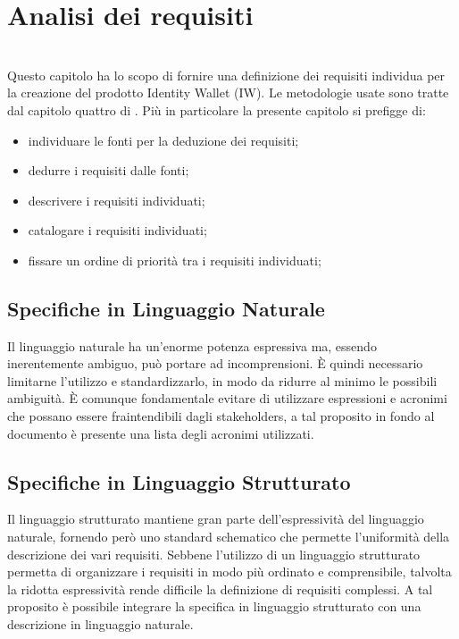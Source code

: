 
\chapter{Analisi dei requisiti}
\label{cap:analisi-requisiti}

\\
Questo capitolo ha lo scopo di fornire una definizione dei requisiti individua per la creazione del prodotto Identity Wallet (IW). Le metodologie usate sono tratte dal capitolo quattro di \cite{som:swe}.
Più in particolare la presente capitolo si prefigge di: 
\begin{itemize}
    \item individuare le fonti per la deduzione dei requisiti; 
    \item dedurre i requisiti dalle fonti; 
    \item descrivere i requisiti individuati; 
    \item catalogare i requisiti individuati; 
    \item fissare un ordine di priorità tra i requisiti individuati;
\end{itemize}
\section{Specifiche in Linguaggio Naturale}
Il linguaggio naturale ha un’enorme potenza espressiva ma, essendo inerentemente ambiguo, può portare ad incomprensioni. È quindi necessario limitarne l’utilizzo e standardizzarlo, in modo da ridurre al minimo le possibili ambiguità. È comunque fondamentale evitare di utilizzare espressioni e acronimi che possano essere fraintendibili dagli stakeholders, a tal proposito in fondo al documento è presente una lista degli acronimi utilizzati.
\section{Specifiche in Linguaggio Strutturato}
Il linguaggio strutturato mantiene gran parte dell’espressività del linguaggio naturale, fornendo però uno standard schematico che permette l’uniformità della descrizione dei vari requisiti. Sebbene l’utilizzo di un linguaggio strutturato permetta di organizzare i requisiti in modo più ordinato e comprensibile, talvolta la ridotta espressività rende difficile la definizione di requisiti complessi. A tal proposito è possibile integrare la specifica in linguaggio strutturato con una descrizione in linguaggio naturale.
